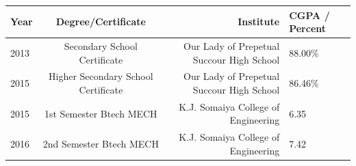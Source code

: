 \documentclass[letterpaper,11pt]{article}
\begin{document}
\begin{table}[h!]
	\begin{center}
		\begin{tabular}{|l|c|r|l|} %
			\hline
			\hspace{0.2cm}\textbf{Year}\hspace{0.2cm} &\hspace{0.2cm} \textbf{Degree/Certificate}\hspace{0.2cm} &\hspace{0.2cm} \textbf{Institute}\hspace{2.5cm} &\hspace{0.2cm} \textbf{CGPA / Percent }\hspace{0.2cm}\\
			\hline
			\hspace{0.2cm}2013 & \hspace{0.2cm} Secondary School Certificate \hspace{0.2cm} & \hspace{0.2cm}Our Lady of Prepetual Succour High School\hspace{0.2cm} & \hspace{1.2cm} 88.00\% \hspace{0.2cm}\\
			\hspace{0.2cm}2015 & \hspace{0.2cm} Higher Secondary School Certificate \hspace{0.2cm} & \hspace{0.2cm}Our Lady of Prepetual Succour High School\hspace{0.2cm} & \hspace{1.2cm} 86.46\% \hspace{0.2cm}\\
			\hspace{0.2cm}2015 & \hspace{0.2cm} 1st Semester Btech  MECH \hspace{0.2cm} &\hspace{0.2cm}K.J. Somaiya College of Engineering\hspace{0.2cm} & \hspace{1.2cm} 6.35 \hspace{0.2cm}\\
			\hspace{0.2cm}2016 & \hspace{0.2cm} 2nd Semester Btech MECH \hspace{0.2cm} &\hspace{0.2cm}K.J. Somaiya College of Engineering\hspace{0.2cm} & \hspace{1.2cm} 7.42 \hspace{0.2cm}\\

\end{tabular}
\end{center}
\end{table}
\end{document}
